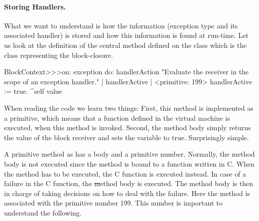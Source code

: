\documentclass[a4paper,10pt,twoside]{book}
\begin{document}



\paragraph{Storing Handlers.}
What we want to understand is how the information (exception type and its associated handler) is stored and how this information is found at run-time. Let us look at the definition of the central method  defined on the class  which is the class representing the block-closure. 

\begin{code}{}
BlockContext>>>on: exception do: handlerAction 
	"Evaluate the receiver in the scope of an exception handler." 
	| handlerActive | 
	<primitive: 199> 
	handlerActive := true. 
	^self value 
\end{code}

When reading the code we learn two things: First, this method is implemented as a primitive, which means that  a function defined in the virtual machine is executed, when this method is invoked. Second, the method body simply returns the value of the block receiver and sets the variable  to true. Surprisingly simple. 

A primitive method as  has a body and a primitive number. Normally, the method body is not executed since the method is bound to a function written in C. When the method has to be executed, the C function is executed instead. In case of a failure in the C function, the \st method body is executed. The method body is then in charge of taking decisions on how to deal with the failure.
Here the method  is associated with the primitive number 199. This number is important to understand the following. 
\end{document}
